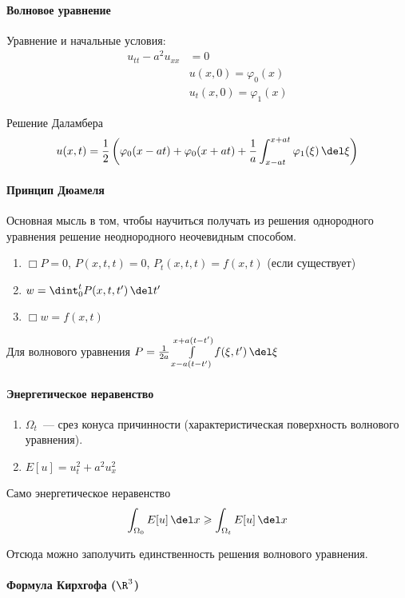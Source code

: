 \documentclass{trchesh}
\def\waveop{\mathop{\boldsymbol\Box}}
\begin{document}
\paragraph{Волновое уравнение}

Уравнение и начальные условия:
\begin{align*}
  u_{tt} - a^2 u_{xx} &= 0 \\
                & u(x,0) = \varphi_0(x) \\
                & u_t(x,0) = \varphi_1(x) 
\end{align*}

Решение Даламбера 
\[
  u(x,t) = \frac12 \left( \varphi_0 (x - at) + \varphi_0(x+at) + 
  \frac{1}{a} \int_{x-at}^{x+at} \varphi_1 (\xi)\, \del\xi \right)
\]

\paragraph{Принцип Дюамеля}
Основная мысль в том, чтобы научиться получать из решения однородного уравнения
решение неоднородного неочевидным способом.
\begin{enumerate}
  \item $\waveop P = 0$, $P(x,t,t) = 0$, $P_t(x,t,t) = f(x,t)$ (если существует)
  \item $w = \dint_0^t P(x,t,t') \, \del t'$
  \item $\waveop w = f(x,t)$
\end{enumerate}
Для волнового уравнения $P = \frac{1}{2a} \int\limits_{x-a(t-t')}^{x+a(t-t')} f(\xi, t')\,\del\xi$


\paragraph{Энергетическое неравенство}

\begin{enumerate}
  \item $\Omega_t$~--- срез конуса причинности 
    (характеристическая поверхность волнового уравнения).
  \item $E[u] = u_t^2 + a^2 u_x^2$
\end{enumerate}
Само энергетическое неравенство
\[
  \int_{\Omega_0} E[u] \, \del x \geqslant \int_{\Omega_t} E[u] \, \del x
\]

Отсюда можно заполучить единственность решения волнового уравнения.

\paragraph{Формула Кирхгофа (\texorpdfstring{$\R^3$}{3D})}
\end{document}
